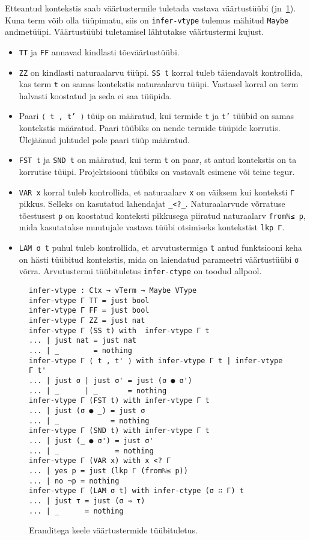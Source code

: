 \documentclass[a4paper,12pt]{article}
\begin{document}
Etteantud kontekstis saab väärtustermile tuletada vastava väärtustüübi (jn~\ref{fig:exc.infer-vtype}).
Kuna term võib olla tüüpimatu, siis on {\tt infer-vtype} tulemus mähitud {\tt Maybe} andmetüüpi.
Väärtustüübi tuletamisel lähtutakse väärtustermi kujust.
\begin{itemize}
\item {\tt TT} ja {\tt FF} annavad kindlasti tõeväärtustüübi.
\item {\tt ZZ} on kindlasti naturaalarvu tüüpi. {\tt SS t} korral tuleb täiendavalt kontrollida, kas term {\tt t} on samas kontekstis naturaalarvu tüüpi. Vastasel korral on term halvasti koostatud ja seda ei saa tüüpida.
\item Paari {\tt ⟨ t , t' ⟩} tüüp on määratud, kui termide {\tt t} ja {\tt t'} tüübid on samas kontekstis määratud. Paari tüübiks on nende termide tüüpide korrutis. Ülejäänud juhtudel pole paari tüüp määratud.
\item {\tt FST t} ja {\tt SND t} on määratud, kui term {\tt t} on paar, st antud kontekstis on ta korrutise tüüpi. Projektsiooni tüübiks on vastavalt esimene või teine tegur.
\item {\tt VAR x} korral tuleb kontrollida, et naturaalarv {\tt x} on väiksem kui konteksti {\tt Γ} pikkus. Selleks on kasutatud lahendajat {\tt _<?_}. Naturaalarvude võrratuse tõestusest {\tt p} on koostatud konteksti pikkusega piiratud naturaalarv {\tt fromℕ≤ p}, mida kasutatakse muutujale vastava tüübi otsimiseks kontekstist {\tt lkp Γ}.
\item {\tt LAM σ t} puhul tuleb kontrollida, et arvutustermiga {\tt t} antud funktsiooni keha on hästi tüübitud kontekstis, mida on laiendatud parameetri väärtustüübi {\tt σ} võrra. Arvutustermi tüübituletus {\tt infer-ctype} on toodud allpool.
\end{itemize}

\begin{figure}
  \begin{BVerbatim}
infer-vtype : Ctx → vTerm → Maybe VType
infer-vtype Γ TT = just bool
infer-vtype Γ FF = just bool
infer-vtype Γ ZZ = just nat
infer-vtype Γ (SS t) with  infer-vtype Γ t
... | just nat = just nat
... | _        = nothing
infer-vtype Γ ⟨ t , t' ⟩ with infer-vtype Γ t | infer-vtype Γ t'
... | just σ | just σ' = just (σ ● σ')
... | _      | _       = nothing
infer-vtype Γ (FST t) with infer-vtype Γ t
... | just (σ ● _) = just σ
... | _            = nothing
infer-vtype Γ (SND t) with infer-vtype Γ t
... | just (_ ● σ') = just σ'
... | _             = nothing
infer-vtype Γ (VAR x) with x <? Γ
... | yes p = just (lkp Γ (fromℕ≤ p))
... | no ¬p = nothing
infer-vtype Γ (LAM σ t) with infer-ctype (σ ∷ Γ) t
... | just τ = just (σ ⇒ τ)
... | _      = nothing
  \end{BVerbatim}
  \caption{Eranditega keele väärtustermide tüübituletus.}
  \label{fig:exc.infer-vtype}
\end{figure}
\end{document}
